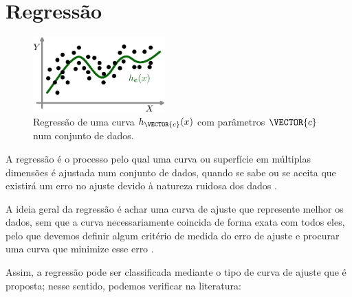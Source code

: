 \section{Regressão}


\begin{figure}
     \centering
     \includegraphics[width=0.45\textwidth]{chapters/notacao/regressao1.eps}
     \caption{Regressão de uma curva $h_{\VECTOR{c}}(x)$ com parâmetros $\VECTOR{c}$ num conjunto de dados. }
     \label{fig:regressao:1}
    \hspace{20pt}
\end{figure}
A regressão é o processo pelo qual uma curva ou superfície em múltiplas dimensões é 
ajustada num conjunto de dados, quando se sabe ou se aceita que existirá um erro no ajuste
devido à natureza ruidosa dos dados \cite[pp. 5]{chapra2016metodos}.

A ideia geral da regressão é achar uma curva de ajuste que represente melhor 
os dados, sem que a curva necessariamente coincida de forma exata com todos eles,
pelo que devemos definir algum critério de medida do erro de ajuste 
e procurar uma curva que minimize esse erro \cite[pp. 7]{chapra2016metodos}.

Assim, a regressão pode ser classificada mediante o tipo de curva de ajuste que é proposta;
nesse sentido, podemos verificar na literatura:

